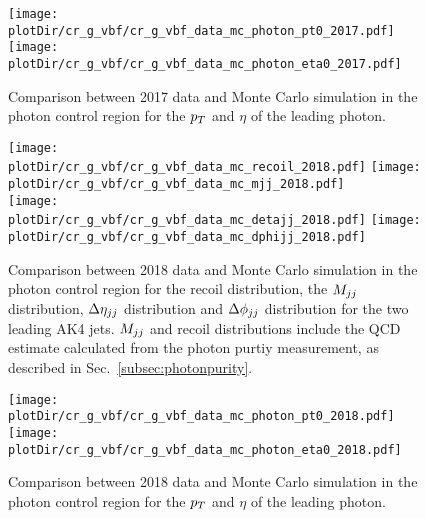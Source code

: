 \begin{figure}[htbp]
    \begin{center}
        \texttt{[image: \\plotDir/cr\_g\_vbf/cr\_g\_vbf\_data\_mc\_photon\_pt0\_2017.pdf]}
        \texttt{[image: \\plotDir/cr\_g\_vbf/cr\_g\_vbf\_data\_mc\_photon\_eta0\_2017.pdf]}
    \end{center}
    \caption{Comparison between 2017 data and Monte Carlo simulation in the photon control region for
        the $p_T$ and $\eta$ of the leading photon.}
    \label{fig:Photon2_vbfhinv_2017}
\end{figure}

\begin{figure}[htbp]
    \begin{center}
        \texttt{[image: \\plotDir/cr\_g\_vbf/cr\_g\_vbf\_data\_mc\_recoil\_2018.pdf]}
        \texttt{[image: \\plotDir/cr\_g\_vbf/cr\_g\_vbf\_data\_mc\_mjj\_2018.pdf]} \\
        \texttt{[image: \\plotDir/cr\_g\_vbf/cr\_g\_vbf\_data\_mc\_detajj\_2018.pdf]}
        \texttt{[image: \\plotDir/cr\_g\_vbf/cr\_g\_vbf\_data\_mc\_dphijj\_2018.pdf]}
    \end{center}
    \caption{Comparison between 2018 data and Monte Carlo simulation in the photon control region for
        the recoil distribution, the $M_{jj}$ distribution, $\Delta \eta_{jj}$ distribution and $\Delta \phi_{jj}$ distribution
        for the two leading AK4 jets. $M_{jj}$ and recoil distributions include the QCD estimate
        calculated from the photon purtiy measurement, as described in Sec.~\ref{subsec:photonpurity}. }
    \label{fig:Photon_vbfhinv_2018}
\end{figure}

\begin{figure}[htbp]
    \begin{center}
        \texttt{[image: \\plotDir/cr\_g\_vbf/cr\_g\_vbf\_data\_mc\_photon\_pt0\_2018.pdf]}
        \texttt{[image: \\plotDir/cr\_g\_vbf/cr\_g\_vbf\_data\_mc\_photon\_eta0\_2018.pdf]}
    \end{center}
    \caption{Comparison between 2018 data and Monte Carlo simulation in the photon control region for
        the $p_T$ and $\eta$ of the leading photon.}
    \label{fig:Photon2_vbfhinv_2018}
\end{figure}

\clearpage